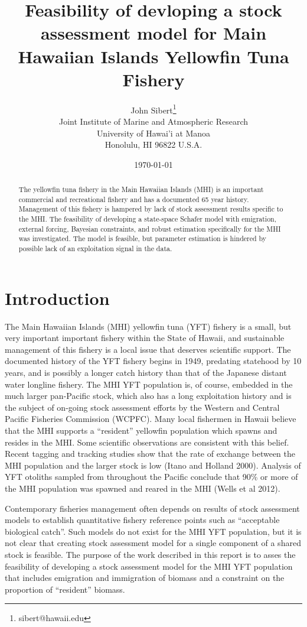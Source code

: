 \documentclass[12pt,letterpaper,twoside]{article}
\title{Feasibility of devloping a stock assessment model for Main Hawaiian Islands Yellowfin Tuna
Fishery}
\author{
John Sibert\thanks{sibert@hawaii.edu}\\
Joint Institute of Marine and Atmospheric Research\\
University of Hawai'i at Manoa\\
Honolulu, HI  96822 U.S.A.\\[0.125in]
\date{\today}
}
\newcommand\doublespacing{\baselineskip=1.6\normalbaselineskip}
\begin{document}
\maketitle


\begin{abstract}
The yellowfin tuna fishery in the Main Hawaiian Islands (MHI)
is an important commercial and recreational fishery and
has a documented 65 year history. Management of this fishery is
hampered by lack of stock assessment results specific to the MHI. The
feasibility of developing a state-space Schafer model with emigration,
external forcing, Bayesian constraints, and robust estimation
specifically for the MHI was investigated. The model is feasible, but
parameter estimation is hindered by possible lack of an exploitation
signal in the data.
\end{abstract}

\section{Introduction}
The Main Hawaiian Islands (MHI) yellowfin tuna (YFT) fishery is 
a small, but very important important fishery within the State of
Hawaii, and sustainable management of this
fishery is a local issue that deserves scientific support.
The documented history of the YFT fishery begins in
1949, predating statehood by 10 years, and is possibly a longer catch
history than that of the Japanese distant water longline fishery.
The MHI YFT population is, of course,
embedded in the much larger pan-Pacific stock, which also has a long
exploitation history and is the subject of on-going stock assessment
efforts by the Western and Central Pacific Fisheries Commission (WCPFC).
Many local fishermen in Hawaii
believe that the MHI supports a ``resident'' yellowfin population
which spawns and resides in the MHI.
Some scientific observations are consistent with this belief. 
Recent tagging and tracking
studies show that the rate of exchange between the MHI population
and the larger stock is low (Itano and Holland 2000). 
Analysis of YFT otoliths sampled from
throughout the Pacific conclude that 90\% or more of the MHI
population was spawned and reared in the MHI (Wells et al 2012).

Contemporary fisheries management often depends on results of stock
assessment models to establish quantitative fishery reference points
such as ``acceptable biological catch''.
Such models do not exist for the MHI YFT population, but
it is not clear that creating stock assessment model
for a single component of a shared stock is feasible.
The purpose of the work described in this report is to asses the
feasibility of developing a stock assessment model for the MHI YFT
population that includes emigration and immigration of biomass and a
constraint on the proportion of ``resident'' biomass.
\end{document}
